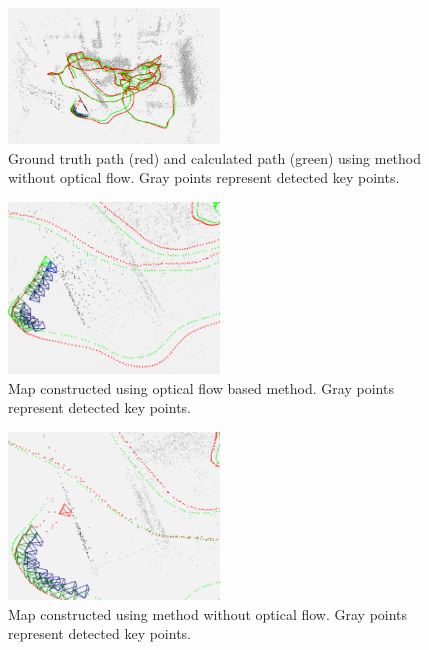 \documentclass[conference]{IEEEtran}
\begin{document}
\begin{figure}
	\label{fig:key_point_global}
	\centering
	\includegraphics[width=0.5\textwidth]{img/key_point_global.png}
	\caption{Ground truth path (red) and calculated path (green) using method without optical flow. Gray points represent detected key points.}
\end{figure}

\begin{figure}
	\label{fig:optical_flow_desk}
	\centering
	\includegraphics[width=0.5\textwidth]{img/optical_flow_desk.png}
	\caption{Map constructed using optical flow based method. Gray points represent detected key points.}
\end{figure}

\begin{figure}
	\label{fig:key_point_desk}
	\centering
	\includegraphics[width=0.5\textwidth]{img/key_point_desk.png}
	\caption{Map constructed using method without optical flow. Gray points represent detected key points.}
\end{figure}
\end{document}
